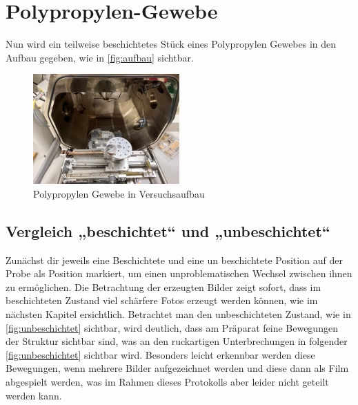 \documentclass[12pt,english,ngerman]{scrartcl}
\begin{document}
\section{Polypropylen-Gewebe}

Nun wird ein teilweise beschichtetes Stück eines Polypropylen Gewebes in den Aufbau gegeben, wie in \autoref{fig:aufbau} sichtbar.

\begin{figure}[H]
	\begin{center}
		\includegraphics[width =0.5\textwidth]{./figures/aufbau.png}
	\end{center}
	\caption{Polypropylen Gewebe in Versuchsaufbau}
    \label{fig:aufbau}
\end{figure}


\subsection{Vergleich „beschichtet“ und „unbeschichtet“}

Zunächst dir jeweils eine Beschichtete und eine un beschichtete Position auf der Probe als Position markiert, um einen
unproblematischen Wechsel zwischen ihnen zu ermöglichen. Die Betrachtung der erzeugten Bilder zeigt sofort, dass im 
beschichteten Zustand viel schärfere Fotos erzeugt werden können, wie im nächsten Kapitel ersichtlich. Betrachtet man 
den unbeschichteten Zustand, wie in \autoref{fig:unbeschichtet} sichtbar, wird deutlich, dass am Präparat feine 
Bewegungen der Struktur sichtbar sind, was an den ruckartigen Unterbrechungen in folgender \autoref{fig:unbeschichtet}
sichtbar wird. Besonders leicht erkennbar werden diese Bewegungen, wenn mehrere Bilder aufgezeichnet werden und diese 
dann als Film abgespielt werden, was im Rahmen dieses Protokolls aber leider nicht geteilt werden kann.
\end{document}
